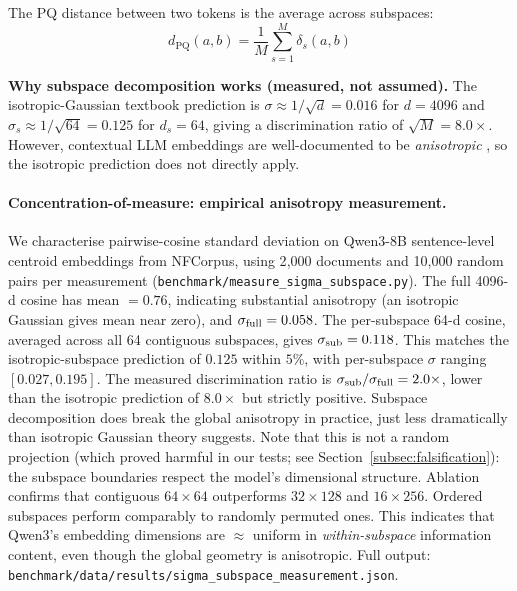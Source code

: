 \documentclass[review,1p]{elsarticle}
\begin{document}
The PQ distance between two tokens is the average across subspaces:
\begin{equation}
\label{eq:pq-dist}
d_{\mathrm{PQ}}(a, b) = \frac{1}{M} \sum_{s=1}^{M} \delta_s(a, b)
\end{equation}

\textbf{Why subspace decomposition works (measured, not assumed).} The isotropic-Gaussian textbook prediction is $\sigma \approx 1/\sqrt{d} = 0.016$ for $d=4096$ and $\sigma_s \approx 1/\sqrt{64} = 0.125$ for $d_s=64$, giving a discrimination ratio of $\sqrt{M} = 8.0\times$. However, contextual LLM embeddings are well-documented to be \emph{anisotropic} \citep{ethayarajh2019contextual,cai2021isotropy}, so the isotropic prediction does not directly apply.

\paragraph{Concentration-of-measure: empirical anisotropy measurement.}\label{subsec:concentration-measurement} We characterise pairwise-cosine standard deviation on Qwen3-8B sentence-level centroid embeddings from NFCorpus, using 2{,}000 documents and 10{,}000 random pairs per measurement (\texttt{benchmark/measure\_sigma\_subspace.py}). The full 4096-d cosine has mean $= 0.76$, indicating substantial anisotropy (an isotropic Gaussian gives mean near zero), and $\sigma_{\rm full} = 0.058$. The per-subspace 64-d cosine, averaged across all 64 contiguous subspaces, gives $\sigma_{\rm sub} = 0.118$. This matches the isotropic-subspace prediction of $0.125$ within $5\%$, with per-subspace $\sigma$ ranging $[0.027, 0.195]$. The measured discrimination ratio is $\sigma_{\rm sub}/\sigma_{\rm full} = 2.0\times$, lower than the isotropic prediction of $8.0\times$ but strictly positive. Subspace decomposition does break the global anisotropy in practice, just less dramatically than isotropic Gaussian theory suggests. Note that this is not a random projection (which proved harmful in our tests; see Section~\ref{subsec:falsification}): the subspace boundaries respect the model's dimensional structure. Ablation confirms that contiguous $64 \times 64$ outperforms $32 \times 128$ and $16 \times 256$. Ordered subspaces perform comparably to randomly permuted ones. This indicates that Qwen3's embedding dimensions are $\approx$ uniform in \emph{within-subspace} information content, even though the global geometry is anisotropic. Full output: \texttt{benchmark/data/results/sigma\_subspace\_measurement.json}.
\end{document}
